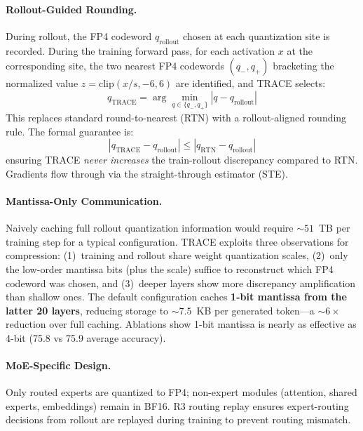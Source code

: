 \documentclass[11pt,a4paper]{article}
\begin{document}
\paragraph{Rollout-Guided Rounding.} During rollout, the FP4 codeword $q_{\text{rollout}}$ chosen at each quantization site is recorded. During the training forward pass, for each activation $x$ at the corresponding site, the two nearest FP4 codewords $(q_-, q_+)$ bracketing the normalized value $z = \text{clip}(x/s, -6, 6)$ are identified, and TRACE selects:
\begin{equation}
q_{\text{TRACE}} = \arg\min_{q \in \{q_-, q_+\}} |q - q_{\text{rollout}}|
\end{equation}
This replaces standard round-to-nearest (RTN) with a rollout-aligned rounding rule. The formal guarantee is:
\begin{equation}
|q_{\text{TRACE}} - q_{\text{rollout}}| \leq |q_{\text{RTN}} - q_{\text{rollout}}|
\end{equation}
ensuring TRACE \emph{never increases} the train-rollout discrepancy compared to RTN. Gradients flow through via the straight-through estimator (STE).

\paragraph{Mantissa-Only Communication.} Naively caching full rollout quantization information would require ${\sim}51$~TB per training step for a typical configuration. TRACE exploits three observations for compression: (1)~training and rollout share weight quantization scales, (2)~only the low-order mantissa bits (plus the scale) suffice to reconstruct which FP4 codeword was chosen, and (3)~deeper layers show more discrepancy amplification than shallow ones. The default configuration caches \textbf{1-bit mantissa from the latter 20 layers}, reducing storage to ${\sim}7.5$~KB per generated token---a ${\sim}6\times$ reduction over full caching. Ablations show 1-bit mantissa is nearly as effective as 4-bit (75.8 vs 75.9 average accuracy).

\paragraph{MoE-Specific Design.} Only routed experts are quantized to FP4; non-expert modules (attention, shared experts, embeddings) remain in BF16. R3 routing replay ensures expert-routing decisions from rollout are replayed during training to prevent routing mismatch.
\end{document}
